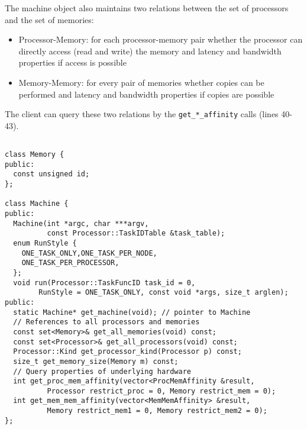 

The machine object also maintains two relations between the set of processors
and the set of memories:
\begin{itemize}
\item Processor-Memory: for each processor-memory pair whether
the processor can directly access (read and write) the memory and 
latency and bandwidth properties if access is possible
\item Memory-Memory: for every pair of memories whether copies can be
performed and latency and bandwidth properties if copies are possible
\end{itemize}

The client can query these two relations by the {\tt get\_*\_affinity} calls
(lines 40-43).  


\begin{lstlisting}[float={t},label={lst:machineapi},caption={Machine Interface.}]

class Memory {
public:
  const unsigned id;
};

class Machine {
public:
  Machine(int *argc, char ***argv,
          const Processor::TaskIDTable &task_table);
  enum RunStyle {
    ONE_TASK_ONLY,ONE_TASK_PER_NODE,
    ONE_TASK_PER_PROCESSOR,
  };
  void run(Processor::TaskFuncID task_id = 0, 
        RunStyle = ONE_TASK_ONLY, const void *args, size_t arglen);
public:
  static Machine* get_machine(void); // pointer to Machine
  // References to all processors and memories
  const set<Memory>& get_all_memories(void) const;
  const set<Processor>& get_all_processors(void) const;
  Processor::Kind get_processor_kind(Processor p) const;
  size_t get_memory_size(Memory m) const;
  // Query properties of underlying hardware
  int get_proc_mem_affinity(vector<ProcMemAffinity &result,
          Processor restrict_proc = 0, Memory restrict_mem = 0);
  int get_mem_mem_affinity(vector<MemMemAffinity> &result,
          Memory restrict_mem1 = 0, Memory restrict_mem2 = 0);
};
\end{lstlisting}


